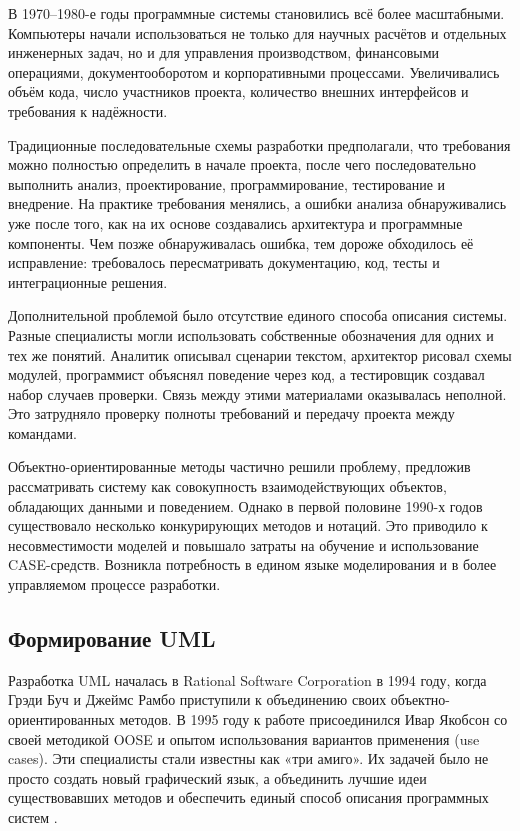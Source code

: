 \documentclass[essay,paper]{pmk-graduate}
\begin{document}
В 1970–1980-е годы программные системы становились всё более масштабными. Компьютеры начали использоваться не только для научных расчётов и отдельных инженерных задач, но и для управления производством, финансовыми операциями, документооборотом и корпоративными процессами. Увеличивались объём кода, число участников проекта, количество внешних интерфейсов и требования к надёжности.

Традиционные последовательные схемы разработки предполагали, что требования можно полностью определить в начале проекта, после чего последовательно выполнить анализ, проектирование, программирование, тестирование и внедрение. На практике требования менялись, а ошибки анализа обнаруживались уже после того, как на их основе создавались архитектура и программные компоненты. Чем позже обнаруживалась ошибка, тем дороже обходилось её исправление: требовалось пересматривать документацию, код, тесты и интеграционные решения.

Дополнительной проблемой было отсутствие единого способа описания системы. Разные специалисты могли использовать собственные обозначения для одних и тех же понятий. Аналитик описывал сценарии текстом, архитектор рисовал схемы модулей, программист объяснял поведение через код, а тестировщик создавал набор случаев проверки. Связь между этими материалами оказывалась неполной. Это затрудняло проверку полноты требований и передачу проекта между командами.

Объектно-ориентированные методы частично решили проблему, предложив рассматривать систему как совокупность взаимодействующих объектов, обладающих данными и поведением. Однако в первой половине 1990-х годов существовало несколько конкурирующих методов и нотаций. Это приводило к несовместимости моделей и повышало затраты на обучение и использование CASE-средств. Возникла потребность в едином языке моделирования и в более управляемом процессе разработки.

\subsection{Формирование UML}

Разработка UML началась в Rational Software Corporation в 1994 году, когда Грэди Буч и Джеймс Рамбо приступили к объединению своих объектно-ориентированных методов. В 1995 году к работе присоединился Ивар Якобсон со своей методикой OOSE и опытом использования вариантов применения (use cases). Эти специалисты стали известны как «три амиго». Их задачей было не просто создать новый графический язык, а объединить лучшие идеи существовавших методов и обеспечить единый способ описания программных систем \cite{omgwhyuml}.
\end{document}
